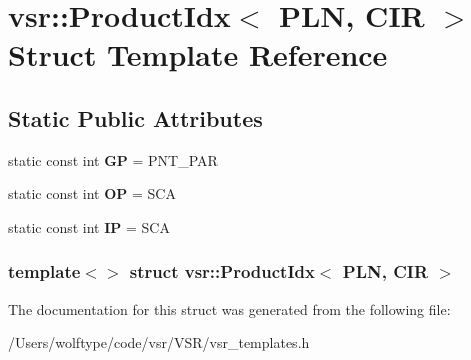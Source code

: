 \hypertarget{structvsr_1_1_product_idx_3_01_p_l_n_00_01_c_i_r_01_4}{\section{vsr\-:\-:Product\-Idx$<$ P\-L\-N, C\-I\-R $>$ Struct Template Reference}
\label{structvsr_1_1_product_idx_3_01_p_l_n_00_01_c_i_r_01_4}
}
\subsection*{Static Public Attributes}
\begin{DoxyCompactItemize}
\item 
\hypertarget{structvsr_1_1_product_idx_3_01_p_l_n_00_01_c_i_r_01_4_a9987fe1f8220c418d01ae197b9c61f76}{static const int {\bfseries G\-P} = P\-N\-T\-\_\-\-P\-A\-R}\label{structvsr_1_1_product_idx_3_01_p_l_n_00_01_c_i_r_01_4_a9987fe1f8220c418d01ae197b9c61f76}

\item 
\hypertarget{structvsr_1_1_product_idx_3_01_p_l_n_00_01_c_i_r_01_4_a5990d70867239dade6cb132ef2e11581}{static const int {\bfseries O\-P} = S\-C\-A}\label{structvsr_1_1_product_idx_3_01_p_l_n_00_01_c_i_r_01_4_a5990d70867239dade6cb132ef2e11581}

\item 
\hypertarget{structvsr_1_1_product_idx_3_01_p_l_n_00_01_c_i_r_01_4_a566b035e35f989c3a433d6ec2defab77}{static const int {\bfseries I\-P} = S\-C\-A}\label{structvsr_1_1_product_idx_3_01_p_l_n_00_01_c_i_r_01_4_a566b035e35f989c3a433d6ec2defab77}

\end{DoxyCompactItemize}
\subsubsection*{template$<$$>$ struct vsr\-::\-Product\-Idx$<$ P\-L\-N, C\-I\-R $>$}



The documentation for this struct was generated from the following file\-:\begin{DoxyCompactItemize}
\item 
/\-Users/wolftype/code/vsr/\-V\-S\-R/vsr\-\_\-templates.\-h\end{DoxyCompactItemize}

